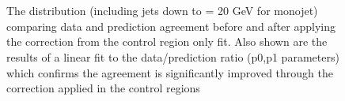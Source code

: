 \begin{figure}[tbhp]
\begin{center}
        \\
         ~~
        \\
        \caption{The \bdphi distribution (including jets down to \pt = 20 GeV for monojet) comparing data and prediction agreement before and after applying the correction from the control region only fit. Also shown are the results of a linear fit to the data/prediction ratio (p0,p1 parameters) which confirms the agreement is significantly improved through the correction applied in the control regions}
    \end{center}
\end{figure}
